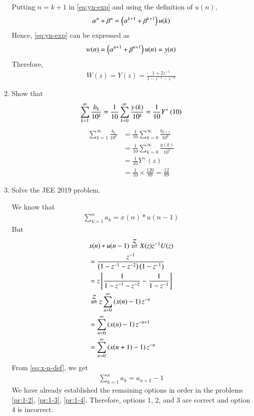 \documentclass[journal,12pt,twocolumn]{IEEEtran}
\renewcommand\thesection{\arabic{section}}
\begin{document}
\begin{enumerate}[label=\thesection.\arabic*,ref=\thesection.\theenumi]
\solution Putting $n = k + 1$ in \eqref{eq:yn-exp} and using the definition of $u(n)$, 
\begin{align}
	\alpha^n + \beta^n = \left(\alpha^{k + 1} + \beta^{k + 1}\right)u(k)
\end{align}
Hence, \eqref{eq:yn-exp} can be expressed as
\begin{align}
	w(n) = \left(\alpha^{n+1} + \beta^{n+1}\right)u(n) = y(n)
\end{align}
Therefore,
\begin{align}
	W(z) = Y(z) = \frac{1 + 2z^{-1}}{1 - z^{-1} - z^{-2}}
\end{align}
\item Show that 
\begin{align}
	\sum_{k=1}^{\infty}\frac{b_k}{10^k} =
	\frac{1}{10}\sum_{k=0}^{\infty}\frac{y\left(k\right)}{10^k} =\frac{1}{10}Y^{+}\left({10}\right)
\end{align}
\label{pr:1-4}
\solution
\begin{align}
	\sum_{k=1}^{\infty}\frac{b_k}{10^k} &= \frac{1}{10}\sum_{k = 0}^{\infty}\frac{b_{k+1}}{10^k} \\
	&= \frac{1}{10}\sum_{k = 0}^{\infty}\frac{y(k)}{10^k} \\
	&= \frac{1}{10}Y^+(z) \\
	&= \frac{1}{10}\times\frac{120}{89} = \frac{12}{89}
\end{align}
\item Solve the JEE 2019 problem.

\solution We know that
\begin{align}
	\sum_{k = 1}^{n}a_k = x(n)*u(n - 1)
\end{align}
But
\begin{align}
	&x(n)*u(n - 1) \overset{\mathcal{Z}}{ \rightleftharpoons} X(z)z^{-1}U(z) \\
	&= \frac{z^{-1}}{\left(1 - z^{-1} - z^{-2}\right)\left(1 - z^{-1}\right)} \\
	&= z{}\left[\frac{1}{1 - z^{-1} - z^{-2}} - \frac{1}{1 - z^{-1}}\right] \\
	&\overset{\mathcal{Z}}{ \rightleftharpoons} z\sum_{n = 0}^{\infty}\left(x(n) - 1\right)z^{-n} \\
	&= \sum_{n = 0}^{\infty}\left(x(n) - 1\right)z^{-n + 1} \\
	&= \sum_{n = 0}^{\infty}\left(x(n + 1) - 1\right)z^{-n} \\
\end{align}
From \eqref{eq:x-n-def}, we get
\begin{align}
	\sum_{k = 1}^{n}a_k = a_{n+2} - 1
\end{align}
We have already established the remaining options in order in the problems
\eqref{pr:1-2}, \eqref{pr:1-3}, \eqref{pr:1-4}. Therefore, options 1, 2,
and 3 are correct and option 4 is incorrect.
\end{enumerate}
\end{document}

